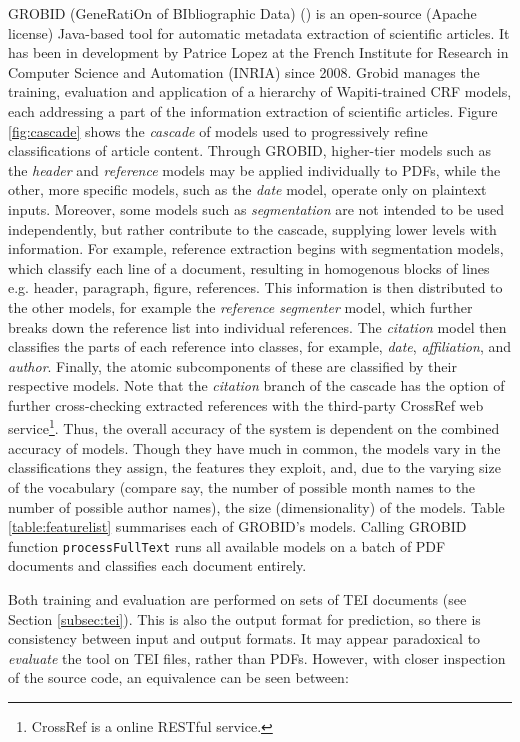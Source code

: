 GROBID (GeneRatiOn of BIbliographic Data) (\cite{lopez2009grobid}) is an open-source (Apache license) Java-based tool for automatic metadata extraction of scientific articles. It has been in development by Patrice Lopez at the French Institute for Research in Computer Science and Automation (INRIA) since 2008. Grobid manages the training, evaluation and application of a hierarchy of Wapiti-trained CRF models, each addressing a part of the information extraction of scientific articles. Figure \ref{fig:cascade} shows the \emph{cascade} of models used to progressively refine classifications of article content. Through GROBID, higher-tier models such as the \emph{header} and \emph{reference} models may be applied individually to PDFs, while the other, more specific models, such as the \emph{date} model, operate only on plaintext inputs. Moreover, some models such as \emph{segmentation} are not intended to be used independently, but rather contribute to the cascade, supplying lower levels with information. For example, reference extraction begins with segmentation models, which classify each line of a document, resulting in homogenous blocks of lines e.g. header, paragraph, figure, references. This information is then distributed to the other models, for example the \emph{reference segmenter} model, which further breaks down the reference list into individual references. The \emph{citation} model then classifies the parts of each reference into classes, for example, \emph{date}, \emph{affiliation}, and \emph{author}. Finally, the atomic subcomponents of these are classified by their respective models. Note that the \emph{citation} branch of the cascade has the option of further cross-checking extracted references with the third-party CrossRef web service\footnote{CrossRef is a online RESTful service.}. Thus, the overall accuracy of the system is dependent on the combined accuracy of models. Though they have much in common, the models vary in the classifications they assign, the features they exploit, and, due to the varying size of the vocabulary (compare say, the number of possible month names to the number of possible author names), the size (dimensionality) of the models. Table \ref{table:featurelist} summarises each of GROBID's models. Calling GROBID function \texttt{processFullText} runs all available models on a batch of PDF documents and classifies each document entirely.

Both training and evaluation are performed on sets of TEI documents (see Section \ref{subsec:tei}). This is also the output format for prediction, so there is consistency between input and output formats. It may appear paradoxical to \emph{evaluate} the tool on TEI files, rather than PDFs. However, with closer inspection of the source code, an equivalence can be seen between:

